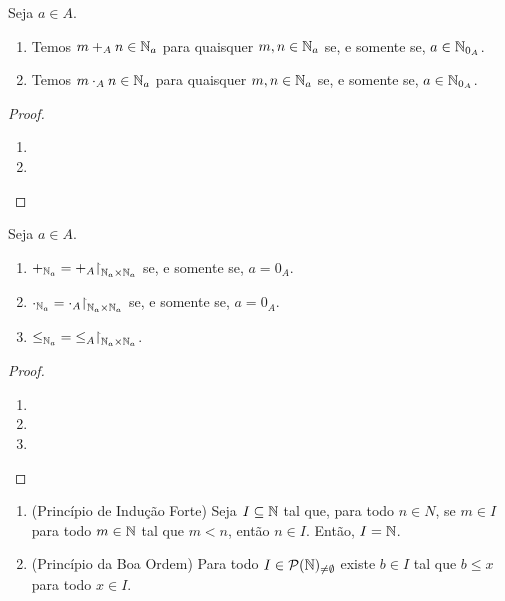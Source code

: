 \begin{proposition}
    Seja $a \in A$.
        \begin{enumerate}[leftmargin=*, align=left, label=\textbf{(\alph*)}]
            \item Temos $m +_{A} n \in \mathbb{N}_{a}$ para quaisquer $m,n \in \mathbb{N}_{a}$ se, e somente se, $a \in \mathbb{N}_{0_{A}}$.
            \item Temos $m \cdot_{A} n \in \mathbb{N}_{a}$ para quaisquer $m,n \in \mathbb{N}_{a}$ se, e somente se, $a \in \mathbb{N}_{0_{A}}$.
        \end{enumerate}
\end{proposition}

\begin{proof}
    \leavevmode
        \begin{enumerate}[leftmargin=*, align=left, label=\textbf{(\alph*)}]
            \item \blackproof
            \item \blackproof
        \end{enumerate}
\end{proof}

\begin{theorem} \label{teo.set:soma_produto_ordem_coincidem_em_dominios}
    Seja $a \in A$. 
        \begin{enumerate}[leftmargin=*, align=left, label=\textbf{(\alph*)}]
            \item $+_{\N_{a}} = +_{A} \restriction_{\N_{a} \times \N_{a}}$ se, e somente se, $a=0_{A}$.
            \item $\cdot_{\N_{a}} = \cdot_{A} \restriction_{\N_{a} \times \N_{a}}$ se, e somente se, $a=0_{A}$.
            \item ${\leq}_{\N_{a}} = {\leq}_{A} \restriction_{\N_{a} \times \N_{a}}$.
        \end{enumerate}
\end{theorem}

\begin{proof}
    \leavevmode
        \begin{enumerate}[leftmargin=*, align=left, label=\textbf{(\alph*)}]
            \item \blackproof
            \item \blackproof
            \item \blackproof
        \end{enumerate}
\end{proof}

\begin{corollary}
    \leavevmode
        \begin{enumerate}[leftmargin=*, align=left, label=\textbf{(\alph*)}]
            \item (Princípio de Indução Forte) Seja $I \subseteq \mathbb{N}$ tal que, para todo $n \in N$, se $m \in I$ para todo $m \in \mathbb{N}$ tal que $m < n$, então $n \in I$. Então, $I = \mathbb{N}$.
            \item (Princípio da Boa Ordem) Para todo $I \in \mathcal{P}(\mathbb{N})_{\neq \emptyset}$ existe $b \in I$ tal que $b \leq x$ para todo $x \in I$.
        \end{enumerate}
\end{corollary}

